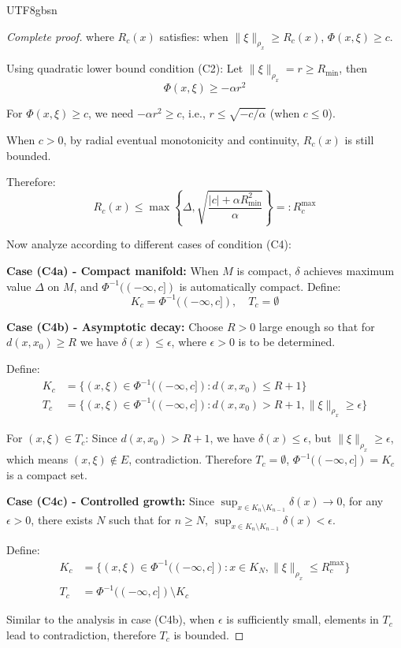 \documentclass[a4paper,12pt]{extarticle}
\theoremstyle{definition}
\begin{document}
\begin{CJK}{UTF8}{gbsn}
\begin{proof}[Complete proof]
where $R_c(x)$ satisfies: when $\|\xi\|_{\rho_x} \geq R_c(x)$, $\Phi(x, \xi) \geq c$.

Using quadratic lower bound condition (C2): Let $\|\xi\|_{\rho_x} = r \geq R_{\min}$, then
$$\Phi(x, \xi) \geq -\alpha r^2$$

For $\Phi(x, \xi) \geq c$, we need $-\alpha r^2 \geq c$, i.e., $r \leq \sqrt{-c/\alpha}$ (when $c \leq 0$).

When $c > 0$, by radial eventual monotonicity and continuity, $R_c(x)$ is still bounded.

Therefore:
$$R_c(x) \leq \max\left\{\Delta, \sqrt{\frac{|c| + \alpha R_{\min}^2}{\alpha}}\right\} =: R_c^{\max}$$

Now analyze according to different cases of condition (C4):

\textbf{Case (C4a) - Compact manifold:}
When $M$ is compact, $\delta$ achieves maximum value $\Delta$ on $M$, and $\Phi^{-1}((-\infty, c])$ is automatically compact. Define:
$$K_c = \Phi^{-1}((-\infty, c]), \quad T_c = \emptyset$$

\textbf{Case (C4b) - Asymptotic decay:}
Choose $R > 0$ large enough so that for $d(x, x_0) \geq R$ we have $\delta(x) \leq \epsilon$, where $\epsilon > 0$ is to be determined.

Define:
\begin{align*}
K_c &= \{(x, \xi) \in \Phi^{-1}((-\infty, c]) : d(x, x_0) \leq R + 1\} \\
T_c &= \{(x, \xi) \in \Phi^{-1}((-\infty, c]) : d(x, x_0) > R + 1, \|\xi\|_{\rho_x} \geq \epsilon\}
\end{align*}

For $(x, \xi) \in T_c$: Since $d(x, x_0) > R + 1$, we have $\delta(x) \leq \epsilon$, but $\|\xi\|_{\rho_x} \geq \epsilon$, which means $(x, \xi) \notin E$, contradiction. Therefore $T_c = \emptyset$, $\Phi^{-1}((-\infty, c]) = K_c$ is a compact set.

\textbf{Case (C4c) - Controlled growth:}
Since $\sup_{x \in K_n \setminus K_{n-1}} \delta(x) \to 0$, for any $\epsilon > 0$, there exists $N$ such that for $n \geq N$, $\sup_{x \in K_n \setminus K_{n-1}} \delta(x) < \epsilon$.

Define:
\begin{align*}
K_c &= \{(x, \xi) \in \Phi^{-1}((-\infty, c]) : x \in K_N, \|\xi\|_{\rho_x} \leq R_c^{\max}\} \\
T_c &= \Phi^{-1}((-\infty, c]) \setminus K_c
\end{align*}

Similar to the analysis in case (C4b), when $\epsilon$ is sufficiently small, elements in $T_c$ lead to contradiction, therefore $T_c$ is bounded.


\end{proof}
\end{CJK}
\end{document}
